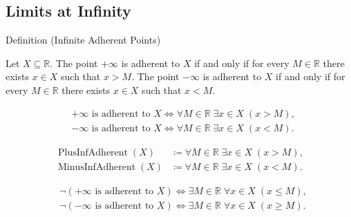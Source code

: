 
\subsection*{Limits at Infinity}
\label{sec:limits-at-infinity}
\begin{definitionbox}{Definition (Infinite Adherent Points)}
\begin{definition}
\label{def:infinite-adherent-points}
Let $X\subseteq\mathbb{R}$. The point $+\infty$ is adherent to $X$ if
and only if for every $M\in\mathbb{R}$ there exists $x\in X$ such that
$x>M$. The point $-\infty$ is adherent to $X$ if and only if for every
$M\in\mathbb{R}$ there exists $x\in X$ such that $x<M$.
\end{definition}
\end{definitionbox}

\begin{remark*}
\[
\begin{aligned}
&+\infty\text{ is adherent to }X
\Longleftrightarrow
\forall M\in\mathbb{R}\;\exists x\in X\;(x>M),\\
&-\infty\text{ is adherent to }X
\Longleftrightarrow
\forall M\in\mathbb{R}\;\exists x\in X\;(x<M).
\end{aligned}
\]
\end{remark*}

\begin{remark*}
\[
\begin{aligned}
\operatorname{PlusInfAdherent}(X)
&\coloneqq
\forall M\in\mathbb{R}\;\exists x\in X\;(x>M),\\
\operatorname{MinusInfAdherent}(X)
&\coloneqq
\forall M\in\mathbb{R}\;\exists x\in X\;(x<M).
\end{aligned}
\]
\end{remark*}

\begin{remark*}
\[
\begin{aligned}
&\neg(+\infty\text{ is adherent to }X)
\Longleftrightarrow
\exists M\in\mathbb{R}\;\forall x\in X\;(x\le M),\\
&\neg(-\infty\text{ is adherent to }X)
\Longleftrightarrow
\exists M\in\mathbb{R}\;\forall x\in X\;(x\ge M).
\end{aligned}
\]
\end{remark*}

